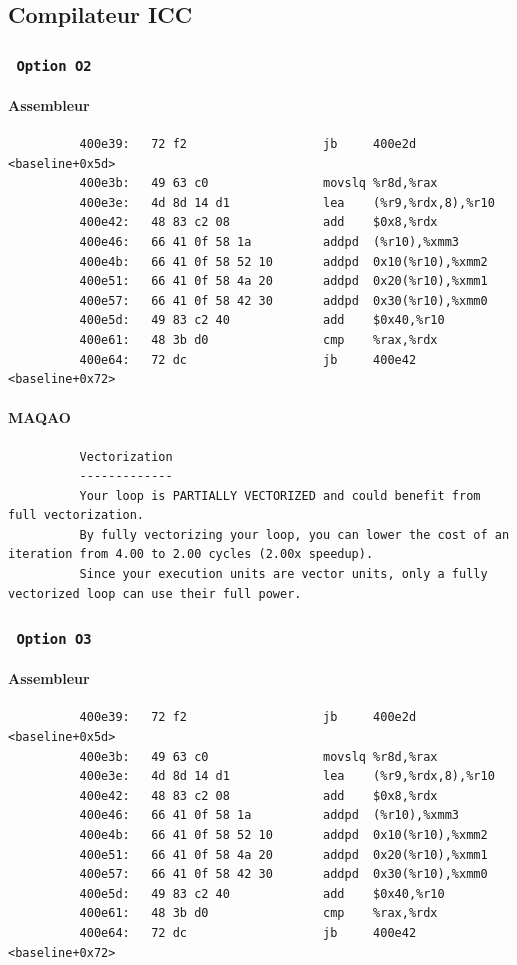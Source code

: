 \documentclass{report}
\begin{document}
      \subsection{Compilateur ICC}
      \subsubsection{ \texttt{ Option O2 } }
      \paragraph{Assembleur}
        \begin{verbatim}
          400e39:	72 f2                	jb     400e2d <baseline+0x5d>
          400e3b:	49 63 c0             	movslq %r8d,%rax
          400e3e:	4d 8d 14 d1          	lea    (%r9,%rdx,8),%r10
          400e42:	48 83 c2 08          	add    $0x8,%rdx
          400e46:	66 41 0f 58 1a       	addpd  (%r10),%xmm3
          400e4b:	66 41 0f 58 52 10    	addpd  0x10(%r10),%xmm2
          400e51:	66 41 0f 58 4a 20    	addpd  0x20(%r10),%xmm1
          400e57:	66 41 0f 58 42 30    	addpd  0x30(%r10),%xmm0
          400e5d:	49 83 c2 40          	add    $0x40,%r10
          400e61:	48 3b d0             	cmp    %rax,%rdx
          400e64:	72 dc                	jb     400e42 <baseline+0x72>
        \end{verbatim}
      \paragraph{MAQAO}
        \begin{verbatim}
          Vectorization
          -------------
          Your loop is PARTIALLY VECTORIZED and could benefit from full vectorization.
          By fully vectorizing your loop, you can lower the cost of an iteration from 4.00 to 2.00 cycles (2.00x speedup).
          Since your execution units are vector units, only a fully vectorized loop can use their full power.
        \end{verbatim}
      \subsubsection{ \texttt{ Option O3 }  }
      \paragraph{Assembleur}
        \begin{verbatim}
          400e39:	72 f2                	jb     400e2d <baseline+0x5d>
          400e3b:	49 63 c0             	movslq %r8d,%rax
          400e3e:	4d 8d 14 d1          	lea    (%r9,%rdx,8),%r10
          400e42:	48 83 c2 08          	add    $0x8,%rdx
          400e46:	66 41 0f 58 1a       	addpd  (%r10),%xmm3
          400e4b:	66 41 0f 58 52 10    	addpd  0x10(%r10),%xmm2
          400e51:	66 41 0f 58 4a 20    	addpd  0x20(%r10),%xmm1
          400e57:	66 41 0f 58 42 30    	addpd  0x30(%r10),%xmm0
          400e5d:	49 83 c2 40          	add    $0x40,%r10
          400e61:	48 3b d0             	cmp    %rax,%rdx
          400e64:	72 dc                	jb     400e42 <baseline+0x72>
        \end{verbatim}
\end{document}

